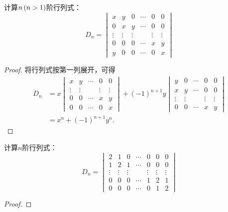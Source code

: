 \begin{problem}
计算\(n\left( n>1 \right)\)阶行列式：
\begin{equation*}
    D_n=
    \begin{vmatrix}
        x      & y      & 0      & \cdots & 0      & 0      \\
        0      & x      & y      & \cdots & 0      & 0      \\
        \vdots & \vdots & \vdots &        & \vdots & \vdots \\
        0      & 0      & 0      & \cdots & x      & y      \\
        y      & 0      & 0      & \cdots & 0      & x
    \end{vmatrix}
\end{equation*}
\end{problem}
\begin{proof}
    将行列式按第一列展开，可得
    \begin{align*}
        D_n & =x
        \begin{vmatrix}
            x      & y      & \cdots & 0      & 0      \\
            \vdots & \vdots &        & \vdots & \vdots \\
            0      & 0      & \cdots & x      & y      \\
            0      & 0      & \cdots & 0      & x
        \end{vmatrix}+(-1)^{n+1}y
        \begin{vmatrix}
            y      & 0      & \cdots & 0      & 0      \\
            x      & y      & \cdots & 0      & 0      \\
            \vdots & \vdots &        & \vdots & \vdots \\
            0      & 0      & \cdots & x      & y
        \end{vmatrix} \\
            & =x^n+(-1)^{n+1}y^n.
    \end{align*}
\end{proof}

\begin{problem}
计算\(n\)阶行列式：
\begin{equation*}
    D_n=
    \begin{vmatrix}
        2      & 1      & 0      & \cdots & 0      & 0      & 0      \\
        1      & 2      & 1      & \cdots & 0      & 0      & 0      \\
        \vdots & \vdots & \vdots &        & \vdots & \vdots & \vdots \\
        0      & 0      & 0      & \cdots & 1      & 2      & 1      \\
        0      & 0      & 0      & \cdots & 0      & 1      & 2
    \end{vmatrix}
\end{equation*}
\end{problem}
\begin{proof}
\end{proof}

